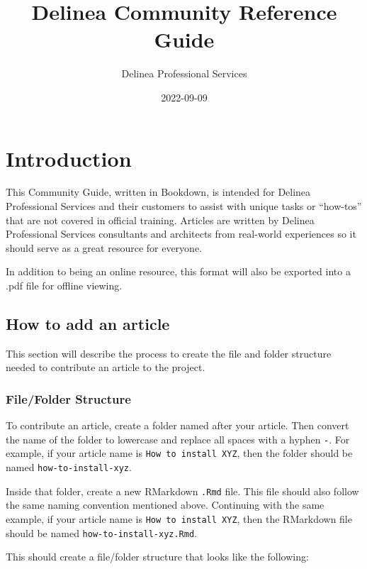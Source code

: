 \documentclass[
]{book}
\title{Delinea Community Reference Guide}
\author{Delinea Professional Services}
\date{2022-09-09}
\begin{document}
\maketitle

{
\setcounter{tocdepth}{1}
\tableofcontents
}
\hypertarget{introduction}{%
\chapter{Introduction}\label{introduction}}

This Community Guide, written in Bookdown, is intended for Delinea Professional Services and their customers to assist with unique tasks or ``how-tos'' that are not covered in official training. Articles are written by Delinea Professional Services consultants and architects from real-world experiences so it should serve as a great resource for everyone.

In addition to being an online resource, this format will also be exported into a .pdf file for offline viewing.

\hypertarget{how-to-add-an-article}{%
\section{How to add an article}\label{how-to-add-an-article}}

This section will describe the process to create the file and folder structure needed to contribute an article to the project.

\hypertarget{filefolder-structure}{%
\subsection{File/Folder Structure}\label{filefolder-structure}}

To contribute an article, create a folder named after your article. Then convert the name of the folder to lowercase and replace all spaces with a hyphen \texttt{-}. For example, if your article name is \texttt{How\ to\ install\ XYZ}, then the folder should be named \texttt{how-to-install-xyz}.

Inside that folder, create a new RMarkdown \texttt{.Rmd} file. This file should also follow the same naming convention mentioned above. Continuing with the same example, if your article name is \texttt{How\ to\ install\ XYZ}, then the RMarkdown file should be named \texttt{how-to-install-xyz.Rmd}.

This should create a file/folder structure that looks like the following:
\end{document}
